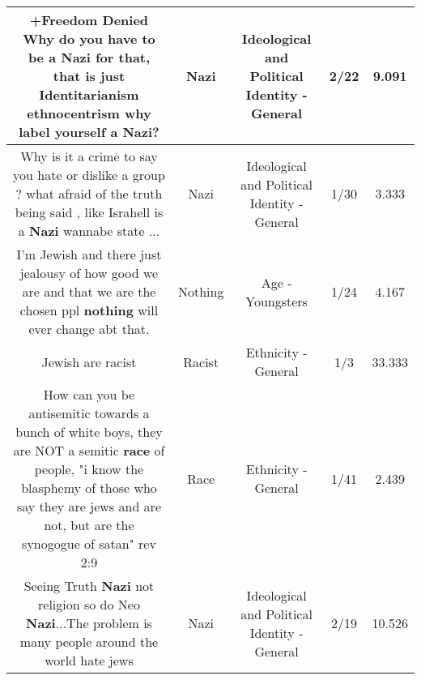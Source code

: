 \documentclass[11pt]{article}
\newlength\mylength
\begin{document}
\begin{center}
\begin{longtable}{|C{.65\mylength}|C{.30\mylength}|C{.12\mylength}|C{.12\mylength}|C{.12\mylength}|}
  \small +Freedom Denied Why do you have to be a \textbf{Nazi} for that, that is just Identitarianism ethnocentrism why label yourself a \textbf{Nazi}?\normalsize   & Nazi &  Ideological and Political Identity - General & 2/22 & 9.091 \\  \hline
  \small Why is it a crime to say you hate or dislike a group ? what afraid of the truth being said , like Israhell is a \textbf{Nazi} wannabe state ...\normalsize   & Nazi &  Ideological and Political Identity - General & 1/30 & 3.333 \\  \hline
  \small I'm Jewish and there just jealousy of how good we are and that we are the chosen ppl \textbf{nothing} will ever change abt that.\normalsize   & Nothing & Age - Youngsters & 1/24 & 4.167 \\  \hline
  \small Jewish are racist\normalsize   & Racist & Ethnicity - General & 1/3 & 33.333 \\  \hline
  \small How can you be antisemitic towards a bunch of white boys, they are NOT a semitic \textbf{race} of people, "i know the blasphemy of those who say they are jews and are not, but are the synogogue of satan" rev 2:9\normalsize   & Race & Ethnicity - General & 1/41 & 2.439 \\  \hline
  \small Seeing Truth \textbf{Nazi} not religion so do Neo \textbf{Nazi}...The problem is many people around the world hate jews\normalsize   & Nazi &  Ideological and Political Identity - General & 2/19 & 10.526 \\  \hline

\end{longtable}
\end{center}
\end{document}
